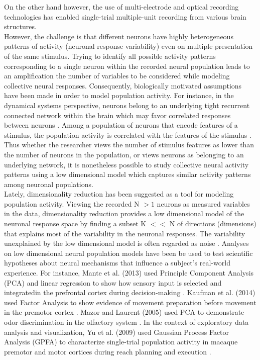 On the other hand however, the use of multi-electrode \cite{Kipke2008} and optical \cite{Kerr2008} recording technologies
has enabled single-trial multiple-unit recording from various brain structures.\\

However, the challenge is that different neurons have highly heterogeneous patterns of activity (neuronal response variability) even on multiple presentation of the same stimulus. Trying to identify all possible activity patterns  corresponding to  a single neuron within the recorded neural population leads to an amplification the number of variables to be considered while modeling collective neural responses. Consequently, biologically motivated assumptions have been made in order to model population activity. For instance, in the dynamical systems perspective, neurons belong to an underlying  tight recurrent connected network within the brain  which may favor correlated responses between neurons \cite{Shenoy2013}.
Among a population of neurons that encode features of a stimulus, the population activity is
correlated with the features of the stimulus \cite{Georgopoulos1982, Hubel1968}.
Thus whether the researcher views the number of stimulus features as lower than the number
of neurons in the population, or views neurons as belonging to an underlying network, it is nonetheless possible to study collective neural activity patterns using a low
dimensional model which captures similar activity patterns among neuronal populations.\\

Lately, dimensionality reduction has been suggested as a tool for modeling population activity. Viewing the recorded N $>1$ neurons as measured variables in the data, dimensionality reduction provides a low dimensional model of the neuronal response space by finding a subset K $<<$ N of directions (dimensions) that explains most of the variability in the neuronal responses. The variability unexplained by the low dimensional model is often regarded as noise \cite{Cunningham2014a}.  Analyses on low dimensional neural population models have been be used to test scientific hypotheses about neural mechanisms that influence a subject's real-world experience. For instance, Mante et al. (2013) used Principle Component Analysis (PCA) and linear regression to show how sensory input is selected and integratedin the prefrontal cortex during decision-making   \cite{Vos2015}.  Kaufman et al. (2014) used Factor Analysis to show evidence of movement preparation before movement in the premotor cortex \cite{Kaufman2014}.  Mazor and Laurent (2005)  used PCA to demonstrate odor discrimination in the olfactory system \cite{Mazor2005}. In the context of exploratory data analysis and visualization, Yu et al. (2009) used Gaussian Process Factor Analysis (GPFA) to characterize single-trial population activity in  macaque premotor and motor cortices during reach planning and execution  \cite{Yu2009} .\\

